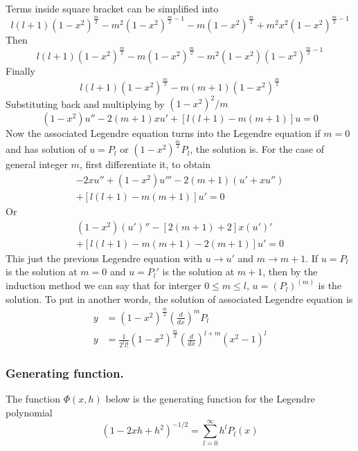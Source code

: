 \documentclass[../main.tex]{subfiles}
\begin{document}
Terms inside square bracket can be simplified into 
\begin{equation*}
    l(l+1)(1-x^2)^{\frac{m}{2}}-m^2(1-x^2)^{\frac{m}{2}-1} -m(1-x^2)^{\frac{m}{2}} +m^2x^2(1-x^2)^{\frac{m}{2}-1}
\end{equation*}
Then 
\begin{equation*}
    l(l+1)(1-x^2)^{\frac{m}{2}}-m(1-x^2)^{\frac{m}{2}} -m^2(1-x^2)(1-x^2)^{\frac{m}{2}-1}
\end{equation*}
Finally 
\begin{equation*}
    l(l+1)(1-x^2)^{\frac{m}{2}} -m(m+1)(1-x^2)^{\frac{m}{2}}
\end{equation*}
Substituting back and multiplying by $(1-x^2)^2/m$
\begin{equation*}
    (1-x^2)u''-2(m+1)xu'+\left[l(l+1)-m(m+1)\right]u=0
\end{equation*}
Now the associated Legendre equation turns into the Legendre equation if $m=0$ and has solution of $u=P_l$ or $(1-x^2)^{\frac{m}{2}}P_l$,  the solution is. For the case of general integer $m$, first differentiate it, to obtain
\begin{gather*}
    -2xu'' +(1-x^2)u'''-2(m+1)(u'+xu'')\\
    +\left[l(l+1)-m(m+1)\right]u'=0
\end{gather*}
Or 
\begin{gather*}
    (1-x^2)(u')''-[2(m+1)+2]x(u')'\\
    +\left[l(l+1)-m(m+1)-2(m+1)\right]u'=0
\end{gather*}
This just the previous Legendre equation with $u\rightarrow u'$ and $m\rightarrow m+1$. If $u=P_l$ is the solution at $m=0$ and $u=P_l'$ is the solution at $m+1$, then by the induction method we can say that for interger $0\leq m\leq l$, $u=(P_l)^{(m)}$ is the solution. To put in another words, the solution of associated Legendre equation is 
\begin{align*}
    y&=(1-x^2)^{\frac{m}{2}}\left(\frac{d}{dx}\right)^m P_l\\
    y&=\frac{1}{2^ll!}(1-x^2)^{\frac{m}{2}}\left(\frac{d}{dx}\right)^{l+m}(x^2-1)^l
\end{align*}


\subsubsection*{Generating function.} The function $\Phi(x,h)$ below is the generating function for the Legendre polynomial
\begin{equation*}
    (1-2xh+h^2)^{-1/2}=\sum_{l=0}^{\infty}h^lP_l(x)
\end{equation*}
\end{document}
